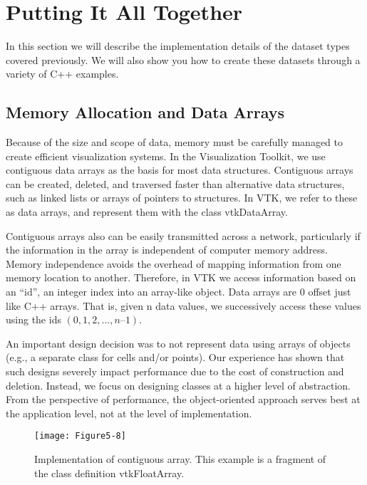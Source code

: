 \section{Putting It All Together}

In this section we will describe the implementation details of the dataset types covered previously. We will also show you how to create these datasets through a variety of C++ examples.

\subsection{Memory Allocation and Data Arrays}

Because of the size and scope of data, memory must be carefully managed to create efficient visualization systems. In the Visualization Toolkit, we use contiguous data arrays as the basis for most data structures. Contiguous arrays can be created, deleted, and traversed faster than alternative data structures, such as linked lists or arrays of pointers to structures. In VTK, we refer to these as data arrays, and represent them with the class vtkDataArray.

Contiguous arrays also can be easily transmitted across a network, particularly if the information in the array is independent of computer memory address. Memory independence avoids the overhead of mapping information from one memory location to another. Therefore, in VTK we access information based on an ``id'', an integer index into an array-like object. Data arrays are 0 offset just like C++ arrays. That is, given n data values, we successively access these values using the ids $(0, 1, 2, ..., n – 1)$.

An important design decision was to not represent data using arrays of objects (e.g., a separate class for cells and/or points). Our experience has shown that such designs severely impact performance due to the cost of construction and deletion. Instead, we focus on designing classes at a higher level of abstraction. From the perspective of performance, the object-oriented approach serves best at the application level, not at the level of implementation.

\begin{figure}[!htb]
	\centering
	\texttt{[image: Figure5-8]}
	\caption{Implementation of contiguous array. This example is a fragment of the class definition vtkFloatArray.}
	\label{fig:Figure5-8}
\end{figure}


